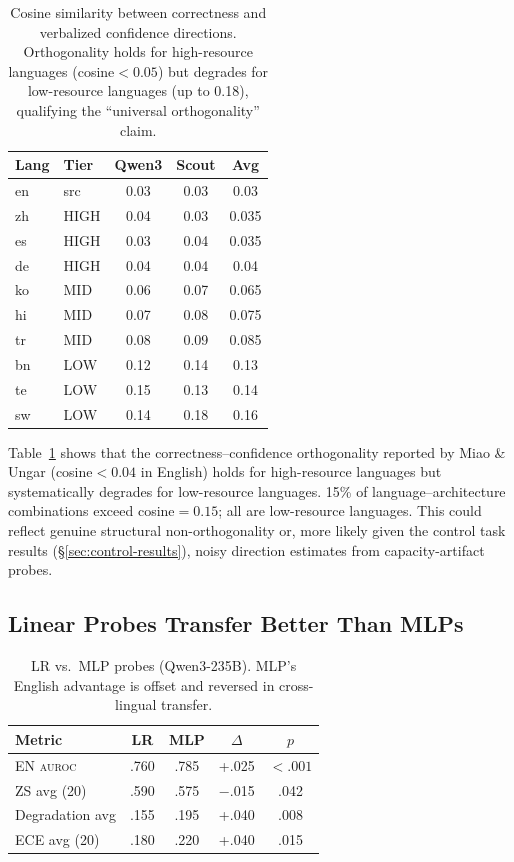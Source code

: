 \documentclass[11pt,a4paper]{article}
\newcommand{\auroc}{\textsc{auroc}}
\begin{document}
\begin{table}[t]
\centering
\small
\begin{tabular}{llccc}
\toprule
\textbf{Lang} & \textbf{Tier} & \textbf{Qwen3} & \textbf{Scout} & \textbf{Avg} \\
\midrule
en & src & 0.03 & 0.03 & 0.03 \\
zh & HIGH & 0.04 & 0.03 & 0.035 \\
es & HIGH & 0.03 & 0.04 & 0.035 \\
de & HIGH & 0.04 & 0.04 & 0.04 \\
ko & MID & 0.06 & 0.07 & 0.065 \\
hi & MID & 0.07 & 0.08 & 0.075 \\
tr & MID & 0.08 & 0.09 & 0.085 \\
bn & LOW & 0.12 & 0.14 & 0.13 \\
te & LOW & 0.15 & 0.13 & 0.14 \\
sw & LOW & 0.14 & 0.18 & 0.16 \\
\bottomrule
\end{tabular}
\caption{Cosine similarity between correctness and verbalized confidence directions. Orthogonality holds for high-resource languages (cosine${<}0.05$) but degrades for low-resource languages (up to 0.18), qualifying the ``universal orthogonality'' claim.}
\label{tab:ortho}
\end{table}

Table~\ref{tab:ortho} shows that the correctness--confidence orthogonality reported by Miao \& Ungar \citeyear{miao2026orthogonality} (cosine${<}0.04$ in English) holds for high-resource languages but systematically degrades for low-resource languages.
15\% of language--architecture combinations exceed cosine$=0.15$; all are low-resource languages.
This could reflect genuine structural non-orthogonality or, more likely given the control task results (\S\ref{sec:control-results}), noisy direction estimates from capacity-artifact probes.

\subsection{Linear Probes Transfer Better Than MLPs}
\label{sec:complexity}

\begin{table}[t]
\centering
\small
\begin{tabular}{lcccc}
\toprule
\textbf{Metric} & \textbf{LR} & \textbf{MLP} & $\Delta$ & $p$ \\
\midrule
EN \auroc{} & .760 & .785 & +.025 & ${<}.001$ \\
ZS avg (20) & .590 & .575 & $-$.015 & .042 \\
Degradation avg & .155 & .195 & +.040 & .008 \\
ECE avg (20) & .180 & .220 & +.040 & .015 \\
\bottomrule
\end{tabular}
\caption{LR vs.\ MLP probes (Qwen3-235B). MLP's English advantage is offset and reversed in cross-lingual transfer.}
\label{tab:lr-vs-mlp}
\end{table}
\end{document}
